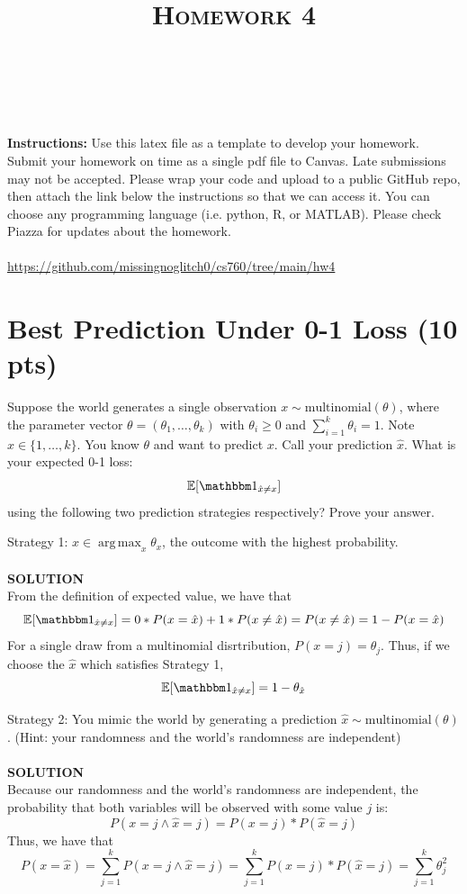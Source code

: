 \documentclass[a4paper]{article}
\title{\textsc{Homework 4}} %
\author{
\red{$>>$Martin Diges$<<$} \\
\red{$>>$9080689699$<<$}\\
}
\date{}
\theoremstyle{definition}
\DeclareMathOperator*{\argmax}{arg\,max}
\def\E{\mathbb E}
\def\ind{\mathbbm 1}
\begin{document}
\maketitle 


\textbf{Instructions:} Use this latex file as a template to develop your homework. Submit your homework on time as a single pdf file to Canvas. Late submissions may not be accepted. Please wrap your code and upload to a public GitHub repo, then attach the link below the instructions so that we can access it. You can choose any programming language (i.e. python, R, or MATLAB). Please check Piazza for updates about the homework.
\\\\
\hypersetup{colorlinks=true, linkcolor=cyan}
\url{https://github.com/missingnoglitch0/cs760/tree/main/hw4}



\section{Best Prediction Under 0-1 Loss (10 pts)}
Suppose the world generates a single observation $x \sim \mbox{multinomial}(\theta)$, where the parameter vector $\theta=(\theta_1, \ldots, \theta_k)$ with $\theta_i\ge 0$ and $\sum_{i=1}^k \theta_i=1$.  Note $x \in \{1, \ldots, k\}$.
You know $\theta$ and want to predict $x$. 
Call your prediction $\hat x$.  What is your expected 0-1 loss: 
$$\E[\ind_{\hat x \neq x}]$$
using the following two prediction strategies respectively?  Prove your answer.


Strategy 1: $\hat x \in \argmax_x \theta_x$, the outcome with the highest probability.
\\\\
\textbf{SOLUTION}\\
From the definition of expected value, we have that
$$\E[\ind_{\hat x \neq x}] = 0*P(x = \hat x) + 1*P(x \neq \hat x) = P(x \neq \hat x) = 1 - P(x = \hat x)$$
For a single draw from a multinomial disrtribution, $P(x = j) = \theta_j$. Thus, if we choose the $\hat x$ which satisfies Strategy 1, $$\E[\ind_{\hat x \neq x}] = 1 - \theta_{\hat x}$$

Strategy 2: You mimic the world by generating a prediction $\hat x \sim \mbox{multinomial}(\theta)$.  (Hint: your randomness and the world's randomness are independent)
\\\\
\textbf{SOLUTION}\\
Because our randomness and the world's randomness are independent, the probability that both variables will be observed with some value $j$ is:
$$P(x = j \land \hat x = j) = P(x = j) * P(\hat x = j)$$
Thus, we have that
$$P(x = \hat x) = \sum_{j=1}^{k}{P(x = j \land \hat x = j)} = \sum_{j=1}^{k}{P(x=j) * P(\hat x = j)} = \sum_{j=1}^{k}{\theta_{j}^2}$$
\end{document}
